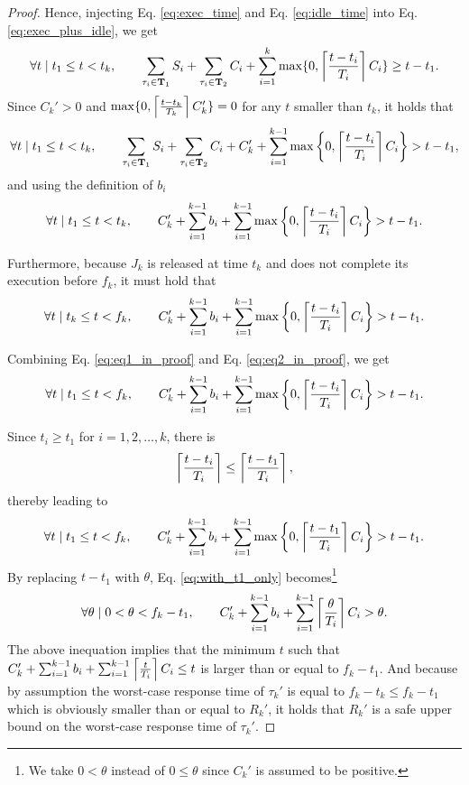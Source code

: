 \begin{proof}
Hence, injecting Eq. \eqref{eq:exec_time} and Eq. \eqref{eq:idle_time} into Eq. \eqref{eq:exec_plus_idle}, we get
\[
\forall t \mid t_1 \leq t < t_k,\qquad  \sum_{\tau_i \in {\bf T}_1} S_i + \sum_{\tau_i \in {\bf T}_2} C_i + \sum_{i=1}^{k} \max\{ 0, \left\lceil{\frac{t- t_i}{T_i} }\right\rceil C_i\}  \geq t-t_1.
\]
Since $C_k' > 0$ and $\max\{ 0, \left\lceil{\frac{t- t_k}{T_k} }\right\rceil C_k'\} = 0$ for any $t$ smaller than $t_k$, it holds that
\[
\forall t \mid t_1 \leq t < t_k,\qquad  \sum_{\tau_i \in {\bf T}_1} S_i + \sum_{\tau_i \in {\bf T}_2} C_i + C_k' + \sum_{i=1}^{k-1} \max\left\{ 0, \left\lceil{\frac{t- t_i}{T_i} }\right\rceil C_i\right\}  > t-t_1,
\]
and using the definition of $b_i$
\begin{equation}
\label{eq:eq1_in_proof}
\forall t \mid t_1 \leq t < t_k,\qquad  C_k'+\sum_{i=1}^{k-1} b_i + \sum_{i=1}^{k-1} \max\left\{ 0, \left\lceil{\frac{t- t_i}{T_i} }\right\rceil C_i\right\} > t-t_1.
\end{equation}

Furthermore, because $J_k$ is released at time $t_k$ and does not complete its execution before $f_k$, it must hold that
\begin{equation}
\label{eq:eq2_in_proof}
\forall t \mid t_k \leq t < f_k,\qquad  C_k'+\sum_{i=1}^{k-1} b_i + \sum_{i=1}^{k-1} \max\left\{ 0, \left\lceil{\frac{t- t_i}{T_i} }\right\rceil C_i\right\} > t-t_1.
\end{equation}

Combining Eq. \eqref{eq:eq1_in_proof} and Eq. \eqref{eq:eq2_in_proof}, we get
\begin{equation}
\label{eq:whole_interval}
\forall t \mid t_1 \leq t < f_k,\qquad  C_k'+\sum_{i=1}^{k-1} b_i + \sum_{i=1}^{k-1} \max\left\{ 0, \left\lceil{\frac{t- t_i}{T_i} }\right\rceil C_i\right\} > t-t_1.
\end{equation}

Since $t_i \geq t_1$ for $i=1,2,\ldots,k$, there is 
$$\left\lceil{\frac{t- t_i}{T_i} }\right\rceil \leq \left\lceil{\frac{t- t_1}{T_i} }\right\rceil,$$
thereby leading to
\begin{equation}
\label{eq:with_t1_only}
\forall t \mid t_1 \leq t < f_k,\qquad  C_k'+\sum_{i=1}^{k-1} b_i + \sum_{i=1}^{k-1} \max\left\{ 0, \left\lceil{\frac{t- t_1}{T_i} }\right\rceil C_i\right\} > t-t_1.
\end{equation}
By replacing $t-t_1$ with $\theta$, Eq. \eqref{eq:with_t1_only} becomes\footnote{We take $0 < \theta$ instead of $0 \leq \theta$ since $C_k'$ is assumed to be positive.}
\[
\forall \theta \mid 0 < \theta < f_k-t_1, \qquad C_k'+\sum_{i=1}^{k-1} b_i + \sum_{i=1}^{k-1} \left\lceil{\frac{\theta}{T_i} }\right\rceil C_i > \theta.
\]
The above inequation implies that the minimum $t$ such that $C_k'+\sum_{i=1}^{k-1} b_i + \sum_{i=1}^{k-1} \left\lceil{\frac{t}{T_i} }\right\rceil C_i \leq t$ is larger than or equal to $f_k-t_1$. And because by assumption the worst-case response time of $\tau_k'$ is equal to $f_k-t_k \leq f_k - t_1$ which is obviously smaller than or equal to $R_k'$, it holds that $R_k'$ is a safe upper bound on the worst-case response time of $\tau_k'$.
\end{proof}

